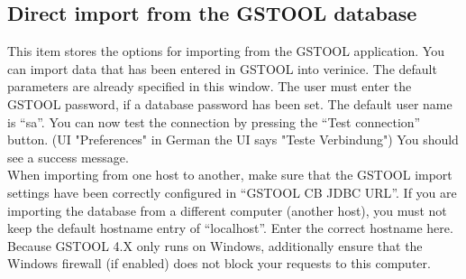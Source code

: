 \documentclass[a4paper,10pt]{book}
\begin{document}
\subsection{Direct import from the GSTOOL database}
This item stores the options for importing from the \textsc{GSTOOL} application. You can import data that has been entered in \textsc{GSTOOL}
into verinice. The default parameters are already specified in this window. The user must enter the \textsc{GSTOOL}
password, if a database password has been set. The default user name is ``sa''.
You can now test the connection by pressing the ``Test connection'' button. (UI "Preferences" in German the UI says "Teste Verbindung") You should see a success message.
\newline\\
When importing from one host to another, make sure that the \textsc{GSTOOL} import settings have been correctly configured in
``\textsc{GSTOOL CB JDBC URL}''. If you are importing the database from a different computer (another host), you must not keep the default
hostname entry of ``localhost''. Enter the correct hostname here. Because \textsc{GSTOOL} 4.X only runs on Windows,
additionally ensure that the Windows firewall (if enabled) does not block your requests to this computer.
\end{document}
